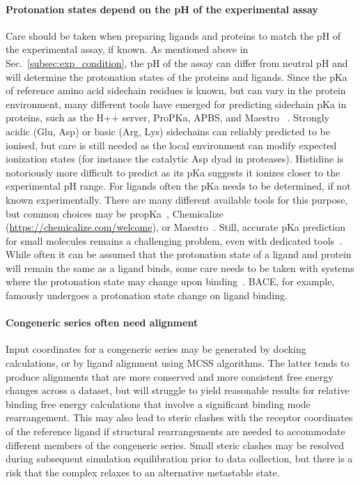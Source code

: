 \documentclass[9pt,bestpractices]{livecoms}
\begin{document}
\paragraph{Protonation states depend on the pH of the experimental assay}
Care should be taken when preparing ligands and proteins to match the pH of the experimental assay, if known. As mentioned above in Sec.~\ref{subsec:exp_condition}, the pH of the assay can differ from neutral pH and will determine the protonation states of the proteins and ligands. Since the pKa of reference amino acid sidechain residues is known, but can vary in the protein environment, many different tools have emerged for predicting sidechain pKa in proteins, such as the H++ server, ProPKa, APBS, and Maestro ~\cite{anandakrishnan2012automating, sondergaard2011improved, jurrus2018improvements, 2020schrodinger}. Strongly acidic (Glu, Asp) or basic (Arg, Lys) sidechains can reliably predicted to be ionised, but care is still needed as the local environment can modify expected ionization states (for instance the catalytic Asp dyad in proteases). Histidine is notoriously more difficult to predict as its pKa suggests it ionizes closer to the experimental pH range. For ligands often the pKa needs to be determined, if not known experimentally. There are many different available tools for this purpose, but common choices may be propKa~\cite{olsson2011propka3,sondergaard2011improved}, Chemicalize (\url{https://chemicalize.com/welcome}), or Maestro~\cite{2020schrodinger}. Still, accurate pKa prediction for small molecules remains a challenging problem, even with dedicated tools~\cite{isik2018pka}. While often it can be assumed that the protonation state of a ligand and protein will remain the same as a ligand binds, some care needs to be taken with systems where the protonation state may change upon binding~\cite{onufriev2013protonation}. BACE, for example, famously undergoes a protonation state change on ligand binding.


\paragraph{Congeneric series often need alignment}
Input coordinates for a congeneric series may be generated by docking calculations, or by ligand alignment using MCSS algorithms. The latter tends to produce alignments that are more conserved and more consistent free energy changes across a dataset, but will struggle to yield reasonable results for relative binding free energy calculations that involve a significant binding mode rearrangement. This may also lead to steric clashes with the receptor coordinates of the reference ligand if structural rearrangements are needed to accommodate different members of the congeneric series. Small steric clashes may be resolved during subsequent simulation equilibration prior to data collection, but there is a risk that the complex relaxes to an alternative metastable state. 
\end{document}
